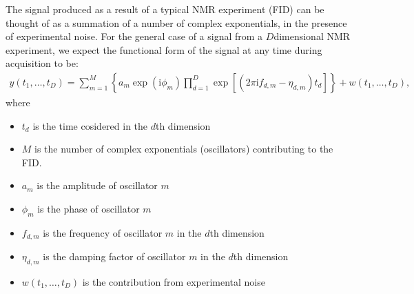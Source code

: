 \documentclass[letterpaper,10pt,english]{sphinxmanual}
\begin{document}
\sphinxAtStartPar
The signal produced as a result of a typical NMR experiment (FID) can be
thought of as a summation of a number of complex exponentials, in
the presence of experimental noise. For the general case of a signal from a
\(D\)\sphinxhyphen{}dimensional NMR experiment, we expect the functional form of the
signal at any time during acquisition to be:
\begin{equation*}
\begin{split}y(t_1, \dots, t_D) = \sum_{m=1}^{M}
\left\lbrace a_m \exp\left(\mathrm{i} \phi_m\right)
\prod_{d=1}^{D} \exp\left[\left(2 \pi \mathrm{i} f_{d,m} -
\eta_{d,m}\right)t_d\right]\right\rbrace + w(t_1, \dots, t_D),\end{split}
\end{equation*}
\sphinxAtStartPar
where
\begin{itemize}
\item {} 
\sphinxAtStartPar
\(t_d\) is the time cosidered in the \(d\)\sphinxhyphen{}th dimension

\item {} 
\sphinxAtStartPar
\(M\) is the number of complex exponentials (oscillators) contributing to the FID.

\item {} 
\sphinxAtStartPar
\(a_m\) is the amplitude of oscillator \(m\)

\item {} 
\sphinxAtStartPar
\(\phi_m\) is the phase of oscillator \(m\)

\item {} 
\sphinxAtStartPar
\(f_{d,m}\) is the frequency of oscillator \(m\) in the
\(d\)\sphinxhyphen{}th dimension

\item {} 
\sphinxAtStartPar
\(\eta_{d,m}\) is the damping factor of oscillator \(m\) in the
\(d\)\sphinxhyphen{}th dimension

\item {} 
\sphinxAtStartPar
\(w(t_1, \dots, t_D)\) is the contribution from experimental noise

\end{itemize}
\end{document}
